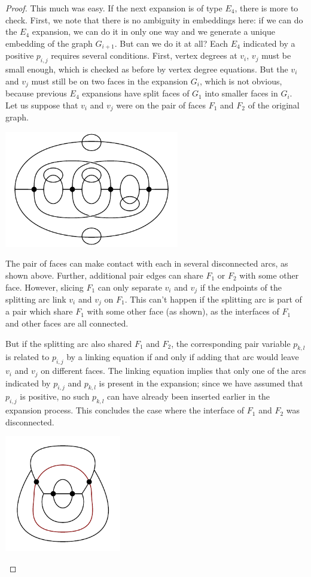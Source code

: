 \documentclass[amsmath,secnumarabic,floatfix,amssymb,nofootinbib,nobibnotes,letterpaper,11pt,tightenlines,showkeys]{revtex4}
\theoremstyle{definition}
\newcommand{\pairinsert}{E_4}
\begin{document}
\begin{proof}
This much was easy. If the next expansion is of type $\pairinsert$, there is more to check. First, we note that there is no ambiguity in embeddings here: if we can do the $\pairinsert$ expansion, we can do it in only one way and we generate a unique embedding of the graph $G_{i+1}$. But can we do it at all? Each $\pairinsert$ indicated by a positive $p_{i,j}$ requires several conditions. First, vertex degrees at $v_i$, $v_j$ must be small enough, which is checked as before by vertex degree equations. But the $v_i$ and $v_j$ must still be on two faces in the expansion $G_i$, which is not obvious, because previous $\pairinsert$ expansions have split faces of $G_1$ into smaller faces in $G_i$. Let us suppose that $v_i$ and $v_j$ were on the pair of faces $F_1$ and $F_2$ of the original graph.
\begin{center}
\includegraphics[width=3in]{pair-interference.pdf}
\end{center}
The pair of faces can make contact with each in several disconnected arcs, as shown above. Further, additional pair edges can share $F_1$ or $F_2$ with some other face. However, slicing $F_1$ can only separate $v_i$ and $v_j$ if the endpoints of the splitting arc link $v_i$ and $v_j$ on $F_1$. This can't happen if the splitting arc is part of a pair which share $F_1$ with some other face (as shown), as the interfaces of $F_1$ and other faces are all connected.

But if the splitting arc also shared $F_1$ and $F_2$, the corresponding pair variable $p_{k,l}$ is related to $p_{i,j}$ by a linking equation if and only if adding that arc would leave $v_i$ and $v_j$ on different faces. The linking equation implies that only one of the arcs indicated by $p_{i,j}$ and $p_{k,l}$ is present in the expansion; since we have assumed that $p_{i,j}$ is positive, no such $p_{k,l}$ can have already been inserted earlier in the expansion process. This concludes the case where the interface of $F_1$ and $F_2$ was disconnected.

\begin{center}
\includegraphics[width=2in]{connected-pair-interaction-case.pdf}
\end{center}


\end{proof}
\end{document}
